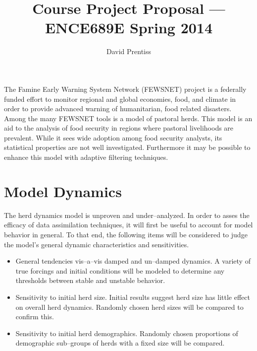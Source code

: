 \documentclass[letterpaper]{tufte-handout}
\title{Course Project Proposal --- ENCE689E Spring 2014}
\author{David Prentiss}
\begin{document}
\maketitle

The Famine Early Warning System Network (FEWSNET) project is a federally funded effort to monitor regional and global economies, food, and climate in order to provide advanced warning of humanitarian, food related disasters.
Among the many FEWSNET tools is a model of pastoral herds. This model is an aid to the analysis of food security in regions where pastoral livelihoods are prevalent. While it sees wide adoption among food security analysts, its statistical properties are not well investigated. Furthermore it may be possible to enhance this model with adaptive filtering techniques.

\section{Model Dynamics}
The herd dynamics model is unproven and under--analyzed. In order to asses the efficacy of data assimilation techniques, it will first be useful to account for model behavior in general. To that end, the following items will be considered to judge the model's general dynamic characteristics and sensitivities. 
\begin{itemize}
  \item General tendencies vis--a--vis damped and un--damped dynamics. A variety of true forcings and initial conditions will be modeled to determine any thresholds between stable and unstable behavior.
  \item Sensitivity to initial herd size. Initial results suggest herd size has little effect on overall herd dynamics. Randomly chosen herd sizes will be compared to confirm this.
  \item Sensitivity to initial herd demographics. Randomly chosen proportions of demographic sub--groups of herds with a fixed size will be compared.
  \end{itemize}
\end{document}
